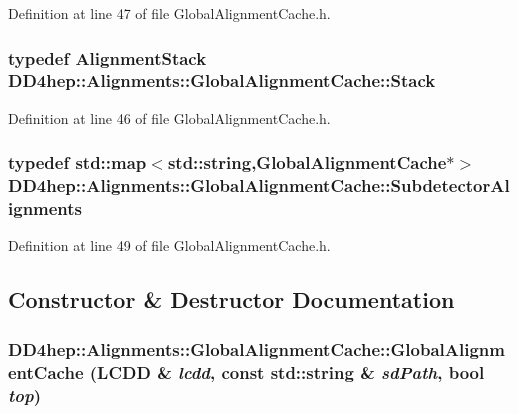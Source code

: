 Definition at line 47 of file GlobalAlignmentCache.h.\hypertarget{class_d_d4hep_1_1_alignments_1_1_global_alignment_cache_a789078b02081705b1f31774ae040523e}{
\subsubsection[{Stack}]{\setlength{\rightskip}{0pt plus 5cm}typedef {\bf AlignmentStack} {\bf DD4hep::Alignments::GlobalAlignmentCache::Stack}}}
\label{class_d_d4hep_1_1_alignments_1_1_global_alignment_cache_a789078b02081705b1f31774ae040523e}


Definition at line 46 of file GlobalAlignmentCache.h.\hypertarget{class_d_d4hep_1_1_alignments_1_1_global_alignment_cache_abedb85cf969b8fb161695f5eca9717bc}{
\subsubsection[{SubdetectorAlignments}]{\setlength{\rightskip}{0pt plus 5cm}typedef std::map$<$std::string,{\bf GlobalAlignmentCache}$\ast$$>$ {\bf DD4hep::Alignments::GlobalAlignmentCache::SubdetectorAlignments}}}
\label{class_d_d4hep_1_1_alignments_1_1_global_alignment_cache_abedb85cf969b8fb161695f5eca9717bc}


Definition at line 49 of file GlobalAlignmentCache.h.

\subsection{Constructor \& Destructor Documentation}
\hypertarget{class_d_d4hep_1_1_alignments_1_1_global_alignment_cache_aab3ed850c3c2d49c4a19a26ab7fc0e07}{
\subsubsection[{GlobalAlignmentCache}]{\setlength{\rightskip}{0pt plus 5cm}DD4hep::Alignments::GlobalAlignmentCache::GlobalAlignmentCache (LCDD \& {\em lcdd}, \/  const std::string \& {\em sdPath}, \/  bool {\em top})}}
\label{class_d_d4hep_1_1_alignments_1_1_global_alignment_cache_aab3ed850c3c2d49c4a19a26ab7fc0e07}



